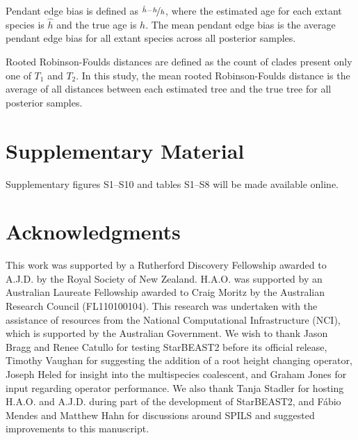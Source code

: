 \documentclass[nogrid]{MBE}%
\begin{document}
Pendant edge bias is defined as $\nicefrac{\hat{h} - h}{h}$, where the estimated
age for each extant species is $\hat{h}$ and the true age is $h$. The mean
pendant edge bias is the average pendant edge bias for all extant species across
all posterior samples.

Rooted Robinson-Foulds distances \citep{ROBINSON1981131} are defined as the
count of clades present only one of $T_1$ and $T_2$. In this study, the mean
rooted Robinson-Foulds distance is the average of all distances between each
estimated tree and the true tree for all posterior samples.

\section{Supplementary Material}
Supplementary figures S1--S10 and tables S1--S8 will be made available online.

\section{Acknowledgments}

This work was supported by a Rutherford Discovery Fellowship awarded to A.J.D.
by the Royal Society of New Zealand. H.A.O. was supported by an Australian
Laureate Fellowship awarded to Craig Moritz by the Australian Research Council
(FL110100104). This research was undertaken with the assistance of resources
from the National Computational Infrastructure (NCI), which is supported by the
Australian Government. We wish to thank Jason Bragg and Renee Catullo for
testing StarBEAST2 before its official release, Timothy Vaughan for suggesting
the addition of a root height changing operator, Joseph Heled for insight into
the multispecies coalescent, and Graham Jones for input regarding operator
performance. We also thank Tanja Stadler for hosting H.A.O. and A.J.D. during part of the
development of StarBEAST2, and F\'abio Mendes and Matthew Hahn for discussions around
SPILS and suggested improvements to this manuscript.

\end{document}
